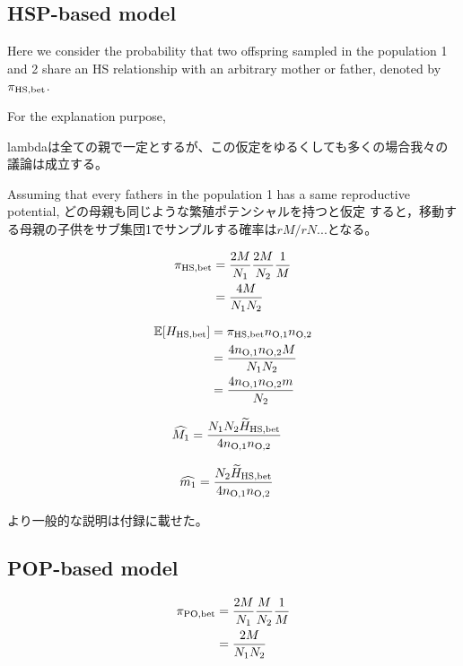 \documentclass[12pt, English]{article}
\begin{document}
\begin{spacing}{1.9}
\subsection{HSP-based model}

Here we consider the probability that two offspring sampled in the population 1 and 2 share an HS relationship with an arbitrary mother or father, denoted by $\pi_{\rm HS, bet}$. 

For the explanation purpose, 

lambdaは全ての親で一定とするが、この仮定をゆるくしても多くの場合我々の議論は成立する。

Assuming that every fathers in the population 1 has a same reproductive potential, どの母親も同じような繁殖ポテンシャルを持つと仮定 すると，移動する母親の子供をサブ集団1でサンプルする確率は$rM/rN$...となる。

\begin{align}
\pi_{\rm HS,bet} &= \frac{2M}{N_{1}} \frac{2M}{N_{2}} \frac{1}{M} \nonumber\\
&= \frac{4M}{N_{1}N_{2}}
\label{HS-1}
\end{align}

\begin{align}
\mathbb{E}[H_{\rm HS, bet}] &= \pi_{\rm HS,bet} n_{\rm O, 1} n_{\rm O, 2} \nonumber\\
&= \frac{ 4 n_{\rm O, 1} n_{\rm O, 2} M } { N_{1} N_{2} } \\
&= \frac{ 4 n_{\rm O, 1} n_{\rm O, 2} m } { N_{2} }
\label{HS-2}
\end{align}

\begin{align}
\widehat{M_1} &= \frac{N_{1} N_{2} \widetilde{H}_{\rm HS, bet} } {4 n_{\rm O, 1} n_{\rm O, 2} }
\label{HS-3}
\end{align}

\begin{align}
\widehat{m_1} &= \frac{N_{2} \widetilde{H}_{\rm HS, bet} } {4 n_{\rm O, 1} n_{\rm O, 2} }
\label{HS-3}
\end{align}

より一般的な説明は付録に載せた。

\subsection{POP-based model}

\begin{align}
\pi_{\rm PO,bet} &= \frac{2M}{N_{1}} \frac{M}{N_{2}} \frac{1}{M} \nonumber\\
&= \frac{2M}{N_{1}N_{2}}
\label{PO-1}
\end{align}


\end{spacing}
\end{document}
